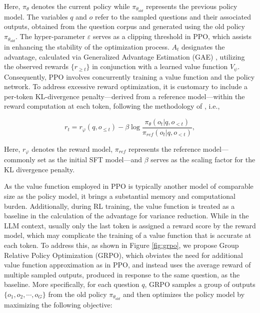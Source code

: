 \begin{itemize}[topsep=0pt]
\begin{itemize}[topsep=0pt]
Here, $\pi_{\theta}$ denotes the current policy while $\pi_{\theta_{old}}$ represents the previous policy model. The variables $q$ and $o$ refer to the sampled questions and their associated outputs, obtained from the question corpus and generated using the old policy $\pi_{\theta_{old}}$. The hyper-parameter $\varepsilon$ serves as a clipping threshold in PPO, which assists in enhancing the stability of the optimization process. $A_t$ designates the advantage, calculated via Generalized Advantage Estimation (GAE) \citep{gae}, utilizing the observed rewards $\{r_{\ge t}\}$ in conjunction with a learned value function $V_{\psi}$. Consequently, PPO involves concurrently training a value function and the policy network. To address excessive reward optimization, it is customary to include a per-token KL-divergence penalty—derived from a reference model—within the reward computation at each token, following the methodology of \citep{ouyang2022training}, i.e.,

\begin{equation}
    r_{t} = r_\varphi(q, o_{\le t}) - \beta \log\frac{\pi_{\theta}(o_{t}|q, o_{<t})}{\pi_{ref}(o_{t}|q, o_{<t})},
\label{eq:PPO-reward}
\end{equation}

Here, $r_\varphi$ denotes the reward model, $\pi_{ref}$ represents the reference model—commonly set as the initial SFT model—and $\beta$ serves as the scaling factor for the KL divergence penalty.

As the value function employed in PPO is typically another model of comparable size as the policy model, it brings a substantial memory and computational burden. Additionally, during RL training, the value function is treated as a baseline in the calculation of the advantage for variance reduction. While in the LLM context, usually only the last token is assigned a reward score by the reward model, which may complicate the training of a value function that is accurate at each token. To address this, as shown in Figure \ref{fig:grpo}, we propose Group Relative Policy Optimization (GRPO), which obviates the need for additional value function approximation as in PPO, and instead uses the average reward of multiple sampled outputs, produced in response to the same question, as the baseline. More specifically, for each question $q$, GRPO samples a group of outputs $\{o_1, o_2, \cdots, o_G\}$  from the old policy  $\pi_{\theta_{old}}$  and then optimizes the policy model by maximizing the following objective:


\end{itemize}
\end{itemize}
